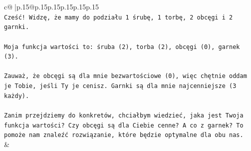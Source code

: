 \documentclass{article}
\begin{document}
{\begin{supertabular}{c@{$\;$}|p{.15\linewidth}@{}p{.15\linewidth}p{.15\linewidth}p{.15\linewidth}p{.15\linewidth}p{.15\linewidth}}
{{{\\ 
\texttt{Cześć! Widzę, że mamy do podziału 1 śrubę, 1 torbę, 2 obcęgi i 2 garnki.} \\
\\ 
\texttt{Moja funkcja wartości to: śruba (2), torba (2), obcęgi (0), garnek (3).} \\
\\ 
\texttt{Zauważ, że obcęgi są dla mnie bezwartościowe (0), więc chętnie oddam je Tobie, jeśli Ty je cenisz. Garnki są dla mnie najcenniejsze (3 każdy).} \\
\\ 
\texttt{Zanim przejdziemy do konkretów, chciałbym wiedzieć, jaka jest Twoja funkcja wartości? Czy obcęgi są dla Ciebie cenne? A co z garnek? To pomoże nam znaleźć rozwiązanie, które będzie optymalne dla obu nas.} \\
            }
        }
    }
    & \\ \\


\end{supertabular}}
\end{document}
